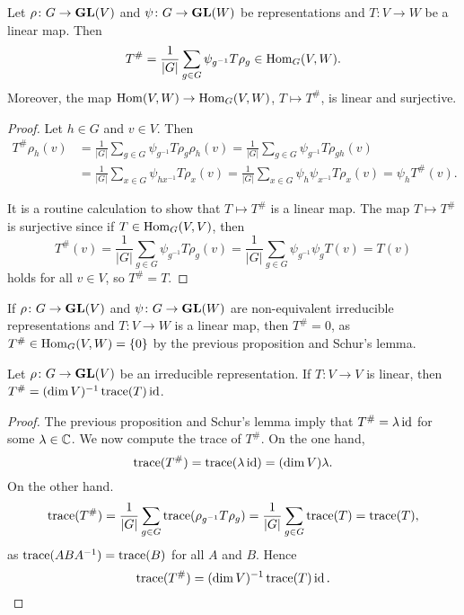 \begin{proposition}
	Let $\rho\colon G\to\mathbf{GL}(V)$ and $\psi\colon G\to\mathbf{GL}(W)$ be representations
	and $T\colon V\to W$ be a linear map. Then
	\[
	T^{\#}=\frac{1}{|G|}\sum_{g\in G}\psi_{g^{-1}}T\rho_g\in\operatorname{Hom}_G(V,W).
	\]
	Moreover, the map $\operatorname{Hom}(V,W)\to\operatorname{Hom}_G(V,W)$, $T\mapsto T^{\#}$, is linear and surjective.  
\end{proposition}

\begin{proof}
  Let $h\in G$ and $v\in V$. Then 
  \begin{align*}
	T^{\#}\rho_h(v)
	&=\frac{1}{|G|}\sum_{g\in G}\psi_{g^{-1}}T\rho_g\rho_h(v)
	=\frac{1}{|G|}\sum_{g\in G}\psi_{g^{-1}}T\rho_{gh}(v)\\
	&=\frac{1}{|G|}\sum_{x\in G}\psi_{hx^{-1}}T\rho_x(v)
	=\frac{1}{|G|}\sum_{x\in G}\psi_h\psi_{x^{-1}}T\rho_x(v)
	=\psi_hT^{\#}(v).
      \end{align*}

    It is a routine calculation to show that $T\mapsto T^{\#}$ is a linear map. The map
    $T\mapsto T^{\#}$ is surjective since 
    if $T\in\operatorname{Hom}_G(V,V)$, then  
	\[
	T^{\#}(v)=\frac{1}{|G|}\sum_{g\in G}\psi_{g^{-1}}T\rho_g(v)
	=\frac{1}{|G|}\sum_{g\in G}\psi_{g^{-1}}\psi_gT(v)
	=T(v)
      \]
    holds for all $v\in V$, so $T^{\#}=T$.  
\end{proof}

If $\rho\colon G\to\mathbf{GL}(V)$ and $\psi\colon
	G\to\mathbf{GL}(W)$ are non-equivalent irreducible representations and $T\colon
	V\to W$ is a linear map, then $T^{\#}=0$, as 
	$T^{\#}\in\operatorname{Hom}_{G}(V,W)=\{0\}$ by the previous proposition and Schur's lemma.

\begin{theorem}
  Let $\rho\colon G\to\mathbf{GL}(V)$ be an irreducible representation. 
  If $T\colon V\to V$ is linear, then 
  $T^{\#}=(\dim V)^{-1}\operatorname{trace}(T)\operatorname{id}$.
\end{theorem}

\begin{proof}
  The previous proposition and Schur's lemma imply that
  $T^{\#}=\lambda\operatorname{id}$ for some $\lambda\in\mathbb{C}$.
  We now compute the trace of $T^{\#}$. On the one hand, 
  \[
	\operatorname{trace}(T^{\#})=\operatorname{trace}(\lambda\operatorname{id})=(\dim V)\lambda.
  \]
  On the other hand.  
  \[
	\operatorname{trace}(T^{\#})
	=\frac{1}{|G|}\sum_{g\in G}\operatorname{trace}(\rho_{g^{-1}}T\rho_g)
	=\frac{1}{|G|}\sum_{g\in G}\operatorname{trace}(T)
	=\operatorname{trace}(T),
  \]
  as $\operatorname{trace}(ABA^{-1})=\operatorname{trace}(B)$ for all $A$ and $B$. 
  Hence 
  \[
  \operatorname{trace}(T^{\#})=(\dim V)^{-1}\operatorname{trace}(T)\operatorname{id}.\qedhere 
  \]
\end{proof}

